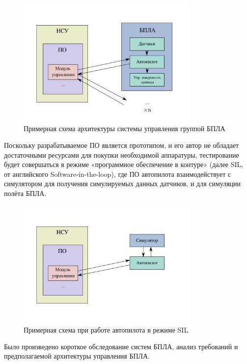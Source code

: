 \documentclass[specification,annotation]{itmo-student-thesis}
\begin{document}
\begin{figure}[!h]
  \caption{Примерная схема архитектуры системы управления группой
  БПЛА}\label{pic:diag-uav-hw}
  \centering
  \includegraphics[width=0.8\textwidth]{diag-uav-hw}
\end{figure}

Поскольку разрабатываемое ПО является прототипом, и его автор не обладает
достаточными ресурсами для покупки необходимой аппаратуры, тестирование будет
совершаться в режиме «программное обеспечение в контуре» (далее SIL, от
английского Software-in-the-loop), где ПО автопилота взаимодействует с
симулятором для получения симулируемых данных датчиков, и для симуляции полёта
БПЛА.

\begin{figure}[!h]
  \caption{Примерная схема при работе автопилота в режиме
  SIL}\label{pic:diag-uav-sil}
  \centering
  \includegraphics[width=0.8\textwidth]{diag-uav-sil}
\end{figure}

\chapterconclusion

Было произведено короткое обследование систем БПЛА, анализ требований и
предполагаемой архитектуры управления БПЛА.
\end{document}
